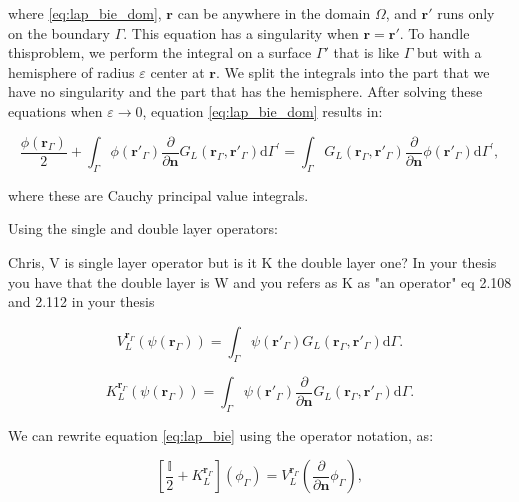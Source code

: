 \noindent where \eqref{eq:lap_bie_dom}, $\mathbf{r}$ can be anywhere in the domain $\Omega$, 
and $\mathbf{r}'$ runs only on the boundary $\Gamma$. This equation has a 
singularity when $\mathbf{r}=\mathbf{r}'$. To handle thisproblem, we perform the
integral on a surface $\Gamma'$ that is like $\Gamma$ but with a hemisphere of 
radius $\varepsilon$ center at $\mathbf{r}$. We split the integrals into the part
that we have no singularity and the part that has the hemisphere. After solving these
equations when $\varepsilon \to 0$, equation \eqref{eq:lap_bie_dom} results in:

\begin{equation} \label{eq:lap_bie}
\frac{\phi(\mathbf{r}_\Gamma)}{2} +  \int_\Gamma \phi(\mathbf{r}'_\Gamma)  \frac{\partial}{\partial \mathbf{n}} G_L(\mathbf{r}_\Gamma,\mathbf{r}'_\Gamma) \text{d} \Gamma^\prime = \int_\Gamma G_L(\mathbf{r}_\Gamma,\mathbf{r}'_\Gamma)  \frac{\partial} {\partial \mathbf{n}} \phi(\mathbf{r}'_\Gamma)  \text{d} \Gamma^\prime,
\end{equation}

\noindent where these are Cauchy principal value integrals.

Using the single and double layer operators:

{\color{red} Chris, V is single layer operator but is it K the double layer one? 
In your thesis you have that the double layer is W and you refers as K as
"an operator" eq 2.108 and 2.112 in your thesis}

\begin{equation}\label{eq:single_layer}
V^{\mathbf{r}_\Gamma}_L (\psi(\mathbf{r}_\Gamma)) = \int_\Gamma \psi(\mathbf{r}'_\Gamma) G_L(\mathbf{r}_\Gamma, \mathbf{r}'_\Gamma) \text{d} \Gamma.
\end{equation}

\begin{equation}\label{eq:double_layer}
K^{\mathbf{r}_\Gamma}_L (\psi(\mathbf{r}_\Gamma)) = \int_\Gamma \psi(\mathbf{r}'_\Gamma) \frac{\partial}{\partial \mathbf{n}}G_L(\mathbf{r}_\Gamma, \mathbf{r}'_\Gamma) \text{d} \Gamma.
\end{equation}

We can rewrite equation \eqref{eq:lap_bie} using the operator notation, as:

\begin{equation} \label{eq:lap_operator}
\left[ \frac{\mathbb{I}}{2} + K_L^{\mathbf{r}_\Gamma} \right] \left( \phi_\Gamma \right) = V_L^{\mathbf{r}_\Gamma} \left( \frac{\partial}{\partial \mathbf{n}} \phi_\Gamma \right),
\end{equation}

